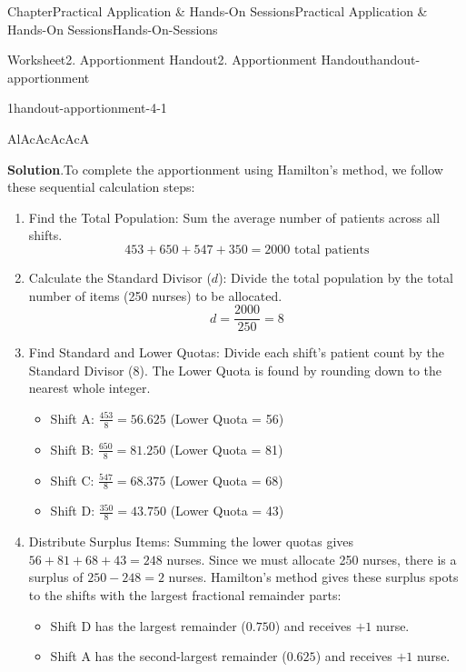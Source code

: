 \documentclass[oneside,10pt,]{book}
\newcommand{\blocktitlefont}{\relax}
\newcommand{\ptxlistdisc}{\raisebox{0.3ex}{\textbullet}}
\begin{document}
\begin{chapterptx}{Chapter}{Practical Application \& Hands-On Sessions}{}{Practical Application \& Hands-On Sessions}{}{}{Hands-On-Sessions}
\begin{worksheet-section}{Worksheet}{2. Apportionment Handout}{}{2. Apportionment Handout}{}{}{handout-apportionment}
\begin{divisionexercise}{1}{}{}{handout-apportionment-4-1}
\begin{center}
{\begin{tabular}{AlAcAcAcAcA}
\end{tabular}
}%
\end{center}%
\par\smallskip%
\noindent\textbf{\blocktitlefont Solution}.\hypertarget{handout-apportionment-4-1-2}{}\quad{}To complete the apportionment using Hamilton's method, we follow these sequential calculation steps:%
\par
%
\begin{enumerate}[label={(\alph*)}]
\item{}Find the Total Population: Sum the average number of patients across all shifts.%
\begin{equation*}
453 + 650 + 547 + 350 = 2000 \text{ total patients}
\end{equation*}
%
\item{}Calculate the Standard Divisor (\(d\)): Divide the total population by the total number of items (250 nurses) to be allocated.%
\begin{equation*}
d = \frac{2000}{250} = 8
\end{equation*}
%
\item{}Find Standard and Lower Quotas: Divide each shift's patient count by the Standard Divisor (\(8\)). The Lower Quota is found by rounding down to the nearest whole integer.%
\begin{itemize}[label=\ptxlistdisc]
\item{}Shift A: \(\frac{453}{8} = 56.625\) (Lower Quota = 56)%
\item{}Shift B: \(\frac{650}{8} = 81.250\) (Lower Quota = 81)%
\item{}Shift C: \(\frac{547}{8} = 68.375\) (Lower Quota = 68)%
\item{}Shift D: \(\frac{350}{8} = 43.750\) (Lower Quota = 43)%
\end{itemize}
%
\item{}Distribute Surplus Items: Summing the lower quotas gives \(56 + 81 + 68 + 43 = 248\) nurses. Since we must allocate 250 nurses, there is a surplus of \(250 - 248 = 2\) nurses. Hamilton's method gives these surplus spots to the shifts with the largest fractional remainder parts:%
\begin{itemize}[label=\ptxlistdisc]
\item{}Shift D has the largest remainder (\(0.750\)) and receives \(+1\) nurse.%
\item{}Shift A has the second-largest remainder (\(0.625\)) and receives \(+1\) nurse.%
\end{itemize}
%
\end{enumerate}

\end{divisionexercise}
\end{worksheet-section}
\end{chapterptx}
\end{document}
